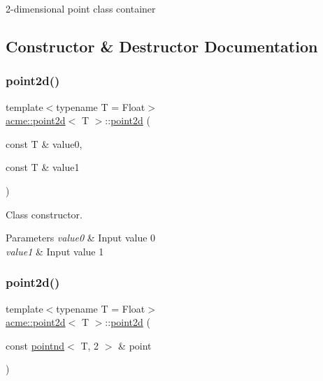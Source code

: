 2-\/dimensional point class container 

\subsection{Constructor \& Destructor Documentation}
\mbox{\label{classacme_1_1point2d_a850b6a667ca69c35114ac1ec83a68f2d}} 
\subsubsection{\texorpdfstring{point2d()}{point2d()}\hspace{0.1cm}{\footnotesize\ttfamily [1/3]}}
{\footnotesize\ttfamily template$<$typename T = Float$>$ \\
\hyperlink{classacme_1_1point2d}{acme\+::point2d}$<$ T $>$\+::\hyperlink{classacme_1_1point2d}{point2d} (\begin{DoxyParamCaption}\item[{const T \&}]{value0,  }\item[{const T \&}]{value1 }\end{DoxyParamCaption})\hspace{0.3cm}{\ttfamily [inline]}}



Class constructor. 


\begin{DoxyParams}{Parameters}
{\em value0} & Input value 0 \\
\hline
{\em value1} & Input value 1 \\
\hline
\end{DoxyParams}
\mbox{\label{classacme_1_1point2d_a01471e5d6f2b7e1851499a9d16187ea5}} 
\subsubsection{\texorpdfstring{point2d()}{point2d()}\hspace{0.1cm}{\footnotesize\ttfamily [2/3]}}
{\footnotesize\ttfamily template$<$typename T = Float$>$ \\
\hyperlink{classacme_1_1point2d}{acme\+::point2d}$<$ T $>$\+::\hyperlink{classacme_1_1point2d}{point2d} (\begin{DoxyParamCaption}\item[{const \hyperlink{classacme_1_1pointnd}{pointnd}$<$ T, 2 $>$ \&}]{point }\end{DoxyParamCaption})\hspace{0.3cm}{\ttfamily [inline]}}



